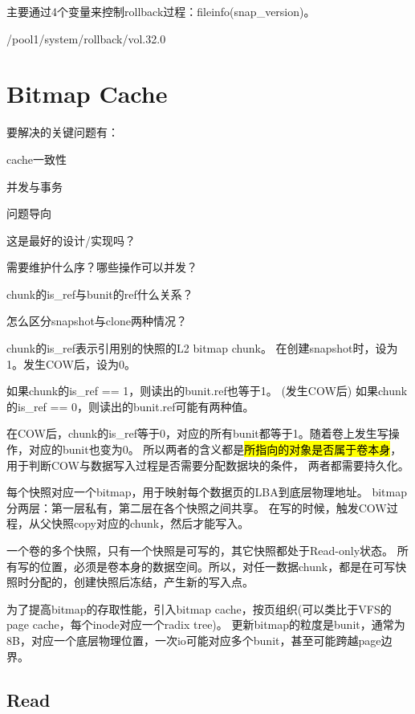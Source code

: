 主要通过4个变量来控制rollback过程：fileinfo(snap\_version)。

/pool1/system/rollback/vol.32.0

\section{Bitmap Cache}

要解决的关键问题有：
\begin{enumbox}
\item cache一致性
\item 并发与事务
\end{enumbox}

问题导向
\begin{enumbox}
\item 这是最好的设计/实现吗？
\item 需要维护什么序？哪些操作可以并发？
\item chunk的is\_ref与bunit的ref什么关系？
\item 怎么区分snapshot与clone两种情况？
\end{enumbox}

chunk的is\_ref表示引用别的快照的L2 bitmap chunk。
在创建snapshot时，设为1。发生COW后，设为0。

如果chunk的is\_ref == 1，则读出的bunit.ref也等于1。
(发生COW后)
如果chunk的is\_ref == 0，则读出的bunit.ref可能有两种值。

在COW后，chunk的is\_ref等于0，对应的所有bunit都等于1。随着卷上发生写操作，对应的bunit也变为0。
所以两者的含义都是\hl{所指向的对象是否属于卷本身}，用于判断COW与数据写入过程是否需要分配数据块的条件，
两者都需要持久化。

每个快照对应一个bitmap，用于映射每个数据页的LBA到底层物理地址。
bitmap分两层：第一层私有，第二层在各个快照之间共享。
在写的时候，触发COW过程，从父快照copy对应的chunk，然后才能写入。

一个卷的多个快照，只有一个快照是可写的，其它快照都处于Read-only状态。
所有写的位置，必须是卷本身的数据空间。所以，对任一数据chunk，都是在可写快照时分配的，创建快照后冻结，产生新的写入点。

为了提高bitmap的存取性能，引入bitmap cache，按页组织(可以类比于VFS的page cache，每个inode对应一个radix tree)。
更新bitmap的粒度是bunit，通常为8B，对应一个底层物理位置，一次io可能对应多个bunit，甚至可能跨越page边界。

\subsection{Read}

